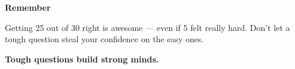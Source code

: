 {\vspace{3mm}

\begin{tcolorbox}[
    enhanced,
    colback=funYellowLight,
    colframe=funYellow!60,
    arc=10pt,
    boxrule=1pt,
    left=6mm, right=6mm, top=4mm, bottom=4mm,
]
{\bfseries\color{funYellowDark} \faLightbulb\hspace{2mm}Remember}

\vspace{2mm}

Getting 25 out of 30 right is awesome — even if 5 felt really hard. Don't let a tough question steal your confidence on the easy ones.
\end{tcolorbox}

\vspace{4mm}

\begin{center}
{\large\bfseries\color{funTealDark} \faMedal\hspace{2mm}Tough questions build strong minds.\hspace{2mm}\faMedal}
\end{center}

}
\newpage
